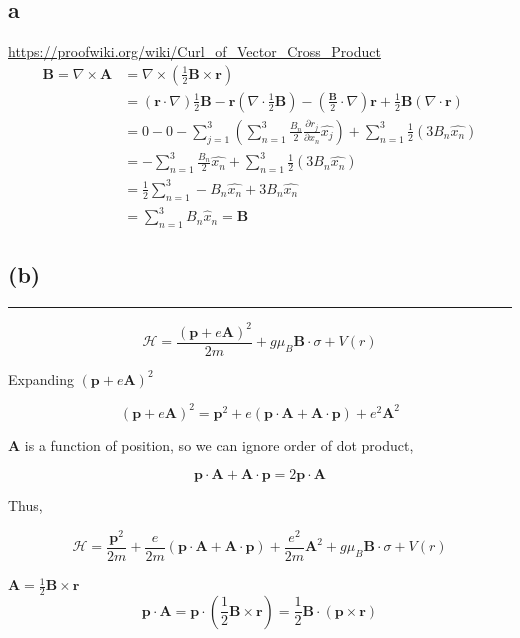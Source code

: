 \documentclass[letter, 10pts]{article}
\begin{document}
\subsection*{a	}
\renewcommand{\vec}{\mathbf}
\url{https://proofwiki.org/wiki/Curl_of_Vector_Cross_Product}
\begin{align*}
\vec{B} = \nabla \times  \vec{A} &= \nabla \times 
\left(\frac{1}{2} \vec{B} \times \vec{r} \right)\\
&=  
\left(\vec{r} \cdot  \nabla \right) \frac{1}{2}\vec{B} - 
\vec{r} \left(\nabla \cdot \frac{1}{2} \vec{B}\right) 
- (\frac{\vec{B}}{2} \cdot  \nabla ) \vec{r} + 
\frac{1}{2} \vec{B} \left(\nabla \cdot \vec{r}\right)
\\
&= 0 - 0 - \sum_{j=1}^{3} \left(
\sum_{n=1}^{3} \frac{B_n}{2} \frac{\partial r_j }{\partial x_n} \hat{x_j}
\right) 
+ \sum_{n=1}^{3} \frac{1}{2} \left(3 B_n \hat{x_n}\right) \\
&=- 
\sum_{n=1}^{3} \frac{B_n}{2}  \hat{x_n}
+ \sum_{n=1}^{3} \frac{1}{2} \left(3 B_n \hat{x_n}\right) \\
&=\frac{1}{2} 
\sum_{n=1}^{3} - {B_n}  \hat{x_n}
 +3 B_n \hat{x_n} \\
& = \sum_{n=1}^{3} B_n \hat{x}_n = \vec{B}
\end{align*}



\subsection*{(b)}
\hrule


\[
\mathcal{H} = \frac{(\mathbf{p} + e \mathbf{A})^2}{2m} + g\mu_B \mathbf{B} \cdot \sigma + V(r)
\]

Expanding \( (\mathbf{p} + e \mathbf{A})^2 \)

\[
(\mathbf{p} + e \mathbf{A})^2 = \mathbf{p}^2 + e (\mathbf{p} \cdot \mathbf{A} + \mathbf{A} \cdot \mathbf{p}) + e^2 \mathbf{A}^2
\]

\( \mathbf{A} \) is a function of position, so we can ignore order of dot product, 

\[
\mathbf{p} \cdot \mathbf{A} + \mathbf{A} \cdot \mathbf{p} = 2 \mathbf{p} \cdot \mathbf{A}
\]

Thus,

\[
\mathcal{H} = \frac{\mathbf{p}^2}{2m} + \frac{e}{2m} (\mathbf{p} \cdot \mathbf{A} + \mathbf{A} \cdot \mathbf{p}) + \frac{e^2}{2m} \mathbf{A}^2 + g\mu_B \mathbf{B} \cdot \sigma + V(r)
\]

\( \mathbf{A} = \frac{1}{2} \mathbf{B} \times \mathbf{r} \)
\[
\mathbf{p} \cdot \mathbf{A} = \mathbf{p} \cdot \left(\frac{1}{2} \mathbf{B} \times \mathbf{r} \right) = \frac{1}{2} \mathbf{B} \cdot (\mathbf{p} \times \mathbf{r})
\]
\end{document}
